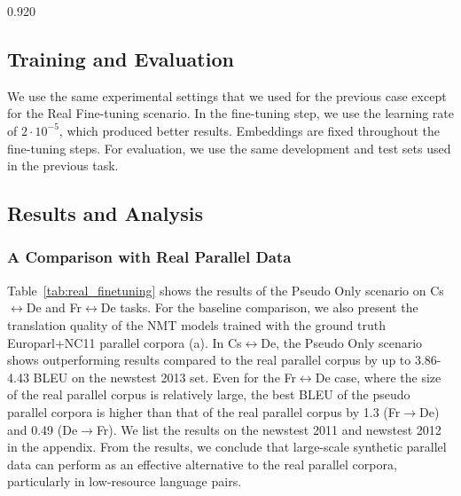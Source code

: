 \documentclass[11pt,letterpaper]{article}
\newcommand{\mylinespacing}{0.920}
\begin{document}
\begin{spacing}{\mylinespacing}
\subsection{Training and Evaluation}
We use the same experimental settings that we used for the previous case except for the Real Fine-tuning scenario. In the fine-tuning step, we use the learning rate of \(2 \cdot 10^{-5}\), which produced better results. Embeddings are fixed throughout the fine-tuning steps. For evaluation, we use the same development and test sets used in the previous task.


\subsection{Results and Analysis}

\subsubsection{A Comparison with Real Parallel Data}
Table~\ref{tab:real_finetuning} shows the results of the Pseudo Only scenario on Cs\(\leftrightarrow\)De and Fr\(\leftrightarrow\)De tasks. For the baseline comparison, we also present the translation quality of the NMT models trained with the ground truth Europarl+NC11 parallel corpora (a). In Cs\(\leftrightarrow\)De, the Pseudo Only scenario shows outperforming results compared to the real parallel corpus by up to 3.86-4.43 BLEU on the newstest 2013 set. Even for the Fr\(\leftrightarrow\)De case, where the size of the real parallel corpus is relatively large, the best BLEU of the pseudo parallel corpora is higher than that of the real parallel corpus by 1.3 (Fr\(\rightarrow\)De) and 0.49 (De\(\rightarrow\)Fr). We list the results on the newstest 2011 and newstest 2012 in the appendix. From the results, we conclude that large-scale synthetic parallel data can perform as an effective alternative to the real parallel corpora, particularly in low-resource language pairs.


\end{spacing}
\end{document}
